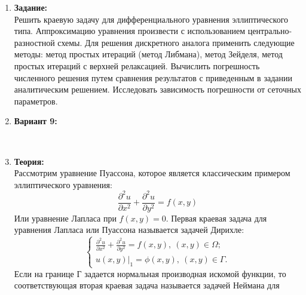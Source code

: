 \documentclass[12pt]{article}
\begin{document}
    \pagestyle{fancy} 
        \fancyhead{}
    \fancyfoot{} 
    \begin{enumerate}
        \item \textbf{Задание:}\\
        Решить краевую задачу для дифференциального уравнения
        эллиптического типа. Аппроксимацию уравнения произвести с
        использованием центрально-разностной схемы. Для решения дискретного
        аналога применить следующие методы: метод простых итераций (метод
        Либмана), метод Зейделя, метод простых итераций с верхней
        релаксацией. Вычислить погрешность численного решения путем
        сравнения результатов с приведенным в задании аналитическим
        решением. Исследовать зависимость погрешности от сеточных
        параметров.
        \item \textbf{Вариант 9:}\\
        \begin{figure}[h]
            \label{ris:image}
        \end{figure}\\
        \item \textbf{Теория:}\\
        Рассмотрим уравнение Пуассона, которое является классическим примером 
        эллиптического уравнения:
        $$\frac{\partial^2u}{\partial x^2}+\frac{\partial^2u}{\partial y^2}=f(x,y)$$
        Или уравнение Лапласа при $f(x,y)=0$.
        Первая краевая задача для уравнения Лапласа или Пуассона называется 
        задачей Дирихле:
        $$\begin{cases}
            \frac{\partial^2u}{\partial x^2}+\frac{\partial^2u}{\partial y^2} = f(x,y),~(x,y)\in \Omega;\\
            u(x,y)|_1 = \phi(x,y),~(x,y)\in \Gamma.
        \end{cases}$$
        Если на границе Г задается нормальная производная искомой функции, то 
        соответствующая вторая краевая задача называется задачей Неймана для 

\end{enumerate}
\end{document}
